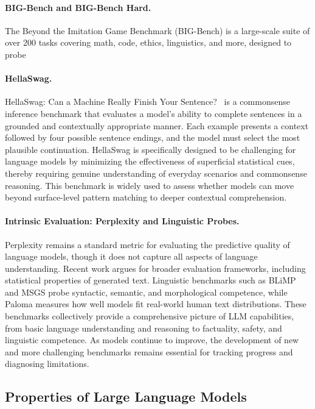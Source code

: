 \paragraph{BIG-Bench and BIG-Bench Hard.} The Beyond the Imitation Game Benchmark (BIG-Bench) \citep{suzgun2023bigbenchhard} is a large-scale suite of over 200 tasks covering math, code, ethics, linguistics, and more, designed to probe

\paragraph{HellaSwag.} HellaSwag: Can a Machine Really Finish Your Sentence?~\citep{zellers2019hellaswag} is a commonsense inference benchmark that evaluates a model's ability to complete sentences in a grounded and contextually appropriate manner. Each example presents a context followed by four possible sentence endings, and the model must select the most plausible continuation. HellaSwag is specifically designed to be challenging for language models by minimizing the effectiveness of superficial statistical cues, thereby requiring genuine understanding of everyday scenarios and commonsense reasoning. This benchmark is widely used to assess whether models can move beyond surface-level pattern matching to deeper contextual comprehension.

\paragraph{Intrinsic Evaluation: Perplexity and Linguistic Probes.} Perplexity \citep{jelinek1977perplexity} remains a standard metric for evaluating the predictive quality of language models, though it does not capture all aspects of language understanding. Recent work \citep{magnusson2024paloma} argues for broader evaluation frameworks, including statistical properties of generated text. Linguistic benchmarks such as BLiMP \citep{warstadt2020blimp} and MSGS \citep{warstadt2020msgs} probe syntactic, semantic, and morphological competence, while Paloma \citep{magnusson2024paloma} measures how well models fit real-world human text distributions.
These benchmarks collectively provide a comprehensive picture of LLM capabilities, from basic language understanding and reasoning to factuality, safety, and linguistic competence. As models continue to improve, the development of new and more challenging benchmarks remains essential for tracking progress and diagnosing limitations.

\subsection{Properties of Large Language Models}

